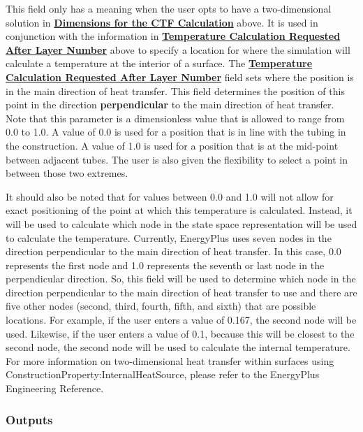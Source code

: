 This field only has a meaning when the user opts to have a two-dimensional solution in \textbf{\hyperref[field-dimensions-for-the-ctf-calculation]{Dimensions for the CTF Calculation}} above.  It is used in conjunction with the information in \textbf{\hyperref[field-temperature-calculation-requested-after-layer-number]{Temperature Calculation Requested After Layer Number}} above to specify a location for where the simulation will calculate a temperature at the interior of a surface.  The \textbf{\hyperref[field-temperature-calculation-requested-after-layer-number]{Temperature Calculation Requested After Layer Number}} field sets where the position is in the main direction of heat transfer.  This field determines the position of this point in the direction \textbf{perpendicular} to the main direction of heat transfer.  Note that this parameter is a dimensionless value that is allowed to range from 0.0 to 1.0.  A value of 0.0 is used for a position that is in line with the tubing in the construction.  A value of 1.0 is used for a position that is at the mid-point between adjacent tubes.  The user is also given the flexibility to select a point in between those two extremes.

It should also be noted that for values between 0.0 and 1.0 will not allow for
exact positioning of the point at which this temperature is calculated.
Instead, it will be used to calculate which node in the state space
representation will be used to calculate the temperature.  Currently,
EnergyPlus uses seven nodes in the direction perpendicular to the main
direction of heat transfer.  In this case, 0.0 represents the first node and
1.0 represents the seventh or last node in the perpendicular direction.  So,
this field will be used to determine which node in the direction perpendicular to
the main direction of heat transfer to use and there are five other nodes
(second, third, fourth, fifth, and sixth) that are possible locations.  For
example, if the user enters a value of 0.167, the second node will be used.
Likewise, if the user enters a value of 0.1, because this will be closest to
the second node, the second node will be used to calculate the internal
temperature.  For more information on two-dimensional heat transfer within
surfaces using ConstructionProperty:InternalHeatSource, please refer to the
EnergyPlus Engineering Reference.

\subsubsection{Outputs}\label{outputs-36-1}

